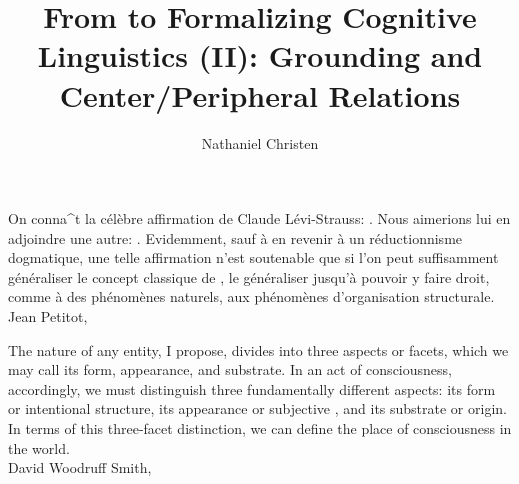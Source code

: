 


%



\title{From  to 
Formalizing Cognitive Linguistics (II): Grounding 
and Center/Peripheral Relations}
\author{Nathaniel Christen}
\newsavebox{\qboxi}
\newsavebox{\qboxii}
\begin{lrbox}{\qboxi}
\begin{frquote}On conna\^{\OldI}t la c\'{e}l\`{e}bre affirmation de Claude L\'{e}vi-Strauss: 
.  Nous aimerions lui en
adjoindre une autre: . 
Evidemment, sauf \`{a} en revenir \`{a} un r\'{e}ductionnisme dogmatique, une telle
affirmation n'est soutenable que si l'on peut suffisamment g\'{e}n\'{e}raliser le concept
classique de , le g\'{e}n\'{e}raliser jusqu'\`{a} pouvoir y faire droit, 
comme \`{a} des ph\'{e}nom\`{e}nes naturels, aux ph\'{e}nom\`{e}nes d'organisation structurale.
\\ \longdash{} Jean Petitot, \cite[p. 1]{PetitotSyntaxe}
\end{frquote}
\end{lrbox}	
\begin{lrbox}{\qboxii}
\begin{frquote}The nature of any entity, I propose, divides into three aspects or facets, which we may call its
	form, appearance, and substrate.  In an act of consciousness, accordingly, we must distinguish
	three fundamentally different aspects: its form or intentional structure, its appearance or
	subjective , and its substrate or origin.  In terms of this three-facet distinction, 
	we can define the place of consciousness in the world.
\\ \longdash{} David Woodruff Smith, \cite[p. 11]{DavidWoodruffSmith}
\end{frquote}
\end{lrbox}	
\twocolumn[\begin{@twocolumnfalse}
\maketitle{}
\begin{abstract}\end{abstract}
\begin{flushright}\usebox{\qboxi}
\usebox{\qboxii}
\end{flushright}
\decoline{}
\vspace{3em}
\end{@twocolumnfalse}]


%





